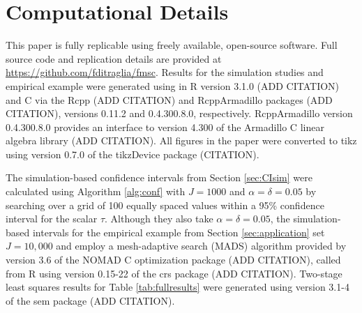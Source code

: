 \section{Computational Details}
\label{append:comp}
This paper is fully replicable using freely available, open-source software.
Full source code and replication details are provided at \url{https://github.com/fditraglia/fmsc}.
Results for the simulation studies and empirical example were generated using in R version 3.1.0 (ADD CITATION) and C\raisebox{0.5ex}{\tiny\textbf{++}} via the Rcpp (ADD CITATION) and RcppArmadillo packages (ADD CITATION), versions 0.11.2 and 0.4.300.8.0, respectively.
RcppArmadillo version 0.4.300.8.0 provides an interface to version 4.300 of the Armadillo C\raisebox{0.5ex}{\tiny\textbf{++}} linear algebra library (ADD CITATION).
All figures in the paper were converted to tikz using version 0.7.0 of the tikzDevice package (CITATION).

The simulation-based confidence intervals from Section \ref{sec:CIsim} were calculated using Algorithm \ref{alg:conf} with $J = 1000$ and $\alpha = \delta = 0.05$ by searching over a grid of 100 equally spaced values within a 95\% confidence interval for the scalar $\tau$.
Although they also take $\alpha = \delta = 0.05$, the simulation-based intervals for the empirical example from Section \ref{sec:application} set $J = 10,000$ and employ a mesh-adaptive search (MADS) algorithm provided by version 3.6 of the NOMAD C\raisebox{0.5ex}{\tiny\textbf{++}} optimization package (ADD CITATION), called from R using version 0.15-22 of the crs package (ADD CITATION).
Two-stage least squares results for Table \ref{tab:fullresults} were generated using version 3.1-4 of the sem package (ADD CITATION).